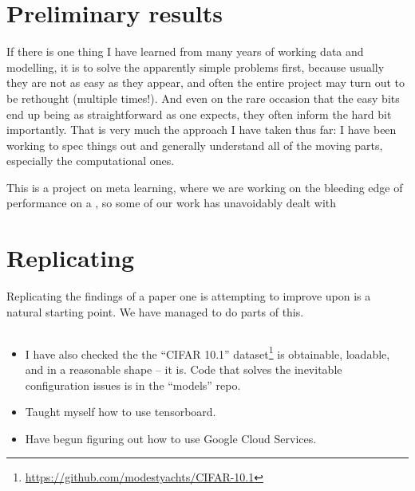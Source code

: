 \documentclass[10pt,twocolumn,letterpaper]{article}
\begin{document}
\section{Preliminary results}

If there is one thing I have learned from many years of working data and modelling, it is to solve the apparently simple problems first, because usually they are not as easy as they appear, and often the entire project may turn out to be rethought (multiple times!). %
And even on the rare occasion that the easy bits end up being as straightforward as one expects, they often inform the hard bit importantly.
That is very much the approach I have taken thus far: I have been working to spec things out and generally understand all of the moving parts, especially the computational ones. 

This is a project on meta learning, where we are working on the bleeding edge of performance on a , so  some of our work has unavoidably dealt with 


\section{Replicating \cite{Cubuk2018}}
Replicating the findings of a paper one is attempting to improve upon is a natural starting point. We have managed to do parts of this. 

\subsection{}
\begin{itemize}
\item I have also checked the the ``CIFAR 10.1'' dataset\footnote{\url{https://github.com/modestyachts/CIFAR-10.1}} is obtainable, loadable, and in a reasonable shape -- it is. Code that solves the inevitable configuration issues is in the ``models'' repo.
\item Taught myself how to use tensorboard.
\item Have begun figuring out how to use Google Cloud Services. 
\end{itemize}
\end{document}
